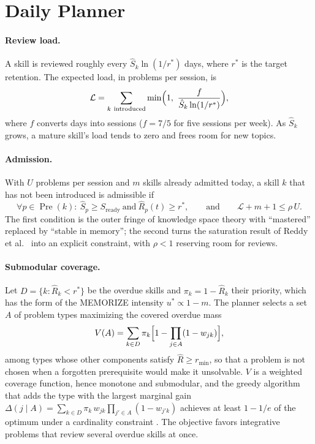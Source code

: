 \documentclass[runningheads]{llncs}
\newcommand{\Pre}{\operatorname{Pre}}
\newcommand{\Rh}{\hat R}
\newcommand{\Sh}{\hat S}
\newcommand{\rstar}{r^{\ast}}
\newcommand{\Slisto}{S_{\mathrm{ready}}}
\newcommand{\Carga}{\mathcal L}
\begin{document}
\section{Daily Planner}
\label{sec:planner}

\paragraph{Review load.} A skill is reviewed roughly every $\Sh_k\ln(1/\rstar)$ days, where $\rstar$ is the target retention. The expected load, in problems per session, is
\begin{equation}
\Carga=\sum_{k\ \text{introduced}}\min\Bigl(1,\ \frac{f}{\Sh_k\ln(1/\rstar)}\Bigr),
\label{eq:load}
\end{equation}
where $f$ converts days into sessions ($f=7/5$ for five sessions per week). As $\Sh_k$ grows, a mature skill's load tends to zero and frees room for new topics.

\paragraph{Admission.} With $U$ problems per session and $m$ skills already admitted today, a skill $k$ that has not been introduced is admissible if
\begin{equation}
\forall p\in\Pre(k):\ \Sh_p\ge\Slisto\ \text{and}\ \Rh_p(t)\ge\rstar,
\qquad\text{and}\qquad
\Carga+m+1\le\rho\,U.
\label{eq:admit}
\end{equation}
The first condition is the outer fringe of knowledge space theory \cite{doignon1985} with ``mastered'' replaced by ``stable in memory''; the second turns the saturation result of Reddy et al.\ \cite{reddy2016} into an explicit constraint, with $\rho<1$ reserving room for reviews.

\paragraph{Submodular coverage.} Let $D=\{k:\Rh_k<\rstar\}$ be the overdue skills and $\pi_k=1-\Rh_k$ their priority, which has the form of the MEMORIZE intensity $u^\ast\propto1-m$. The planner selects a set $A$ of problem types maximizing the covered overdue mass
\begin{equation}
V(A)=\sum_{k\in D}\pi_k\Bigl[1-\prod_{j\in A}(1-w_{jk})\Bigr],
\label{eq:cover}
\end{equation}
among types whose other components satisfy $\Rh\ge r_{\min}$, so that a problem is not chosen when a forgotten prerequisite would make it unsolvable. $V$ is a weighted coverage function, hence monotone and submodular, and the greedy algorithm that adds the type with the largest marginal gain $\Delta(j\mid A)=\sum_{k\in D}\pi_k\,w_{jk}\prod_{j'\in A}(1-w_{j'k})$ achieves at least $1-1/e$ of the optimum under a cardinality constraint \cite{nemhauser1978}. The objective favors integrative problems that review several overdue skills at once.
\end{document}

